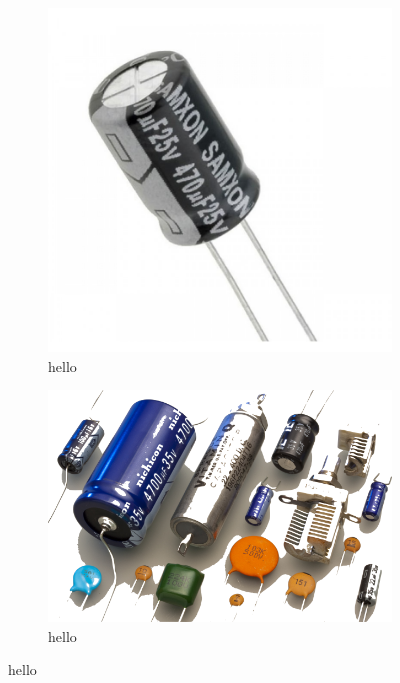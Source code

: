 \documentclass[12pt]{article}
\begin{document}
\begin{figure}[h!]
  \begin{subfigure}[b]{0.25\linewidth}
    \includegraphics[width=\linewidth]{data/condensatore-elettrolitico-valvola.jpg}
    \caption*{hello}
  \end{subfigure}
  \begin{subfigure}[b]{0.25\linewidth}
    \includegraphics[width=\linewidth]{data/capacitors-types.png}
    \caption*{hello}
  \end{subfigure}
\end{figure}
\end{document}
